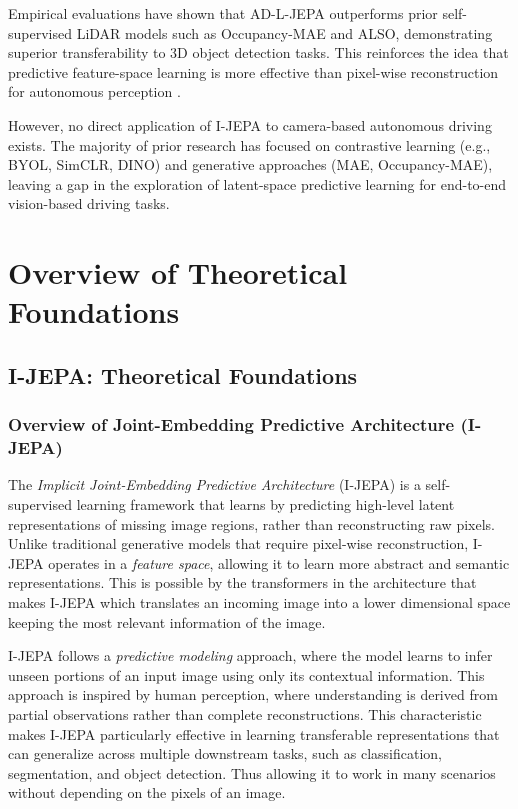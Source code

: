 \documentclass{article}
\begin{document}
Empirical evaluations have shown that AD-L-JEPA outperforms prior self-supervised LiDAR models such as Occupancy-MAE and ALSO, demonstrating superior transferability to 3D object detection tasks. This reinforces the idea that predictive feature-space learning is more effective than pixel-wise reconstruction for autonomous perception \citep{zhu2025ad}.

However, no direct application of I-JEPA to camera-based autonomous driving exists. The majority of prior research has focused on contrastive learning (e.g., BYOL, SimCLR, DINO) and generative approaches (MAE, Occupancy-MAE), leaving a gap in the exploration of latent-space predictive learning for end-to-end vision-based driving tasks.

\section {Overview of Theoretical Foundations}
\subsection{I-JEPA: Theoretical Foundations}

\subsubsection{Overview of Joint-Embedding Predictive Architecture (I-JEPA)}
The \textit{Implicit Joint-Embedding Predictive Architecture} (I-JEPA) \citep{assran2023self} is a self-supervised learning framework that learns by predicting high-level latent representations of missing image regions, rather than reconstructing raw pixels. Unlike traditional generative models that require pixel-wise reconstruction, I-JEPA operates in a \textit{feature space}, allowing it to learn more abstract and semantic representations. This is possible by the transformers in the architecture that makes I-JEPA which translates an incoming image into a lower dimensional space keeping the most relevant information of the image. 

I-JEPA follows a \textit{predictive modeling} approach, where the model learns to infer unseen portions of an input image using only its contextual information. This approach is inspired by human perception, where understanding is derived from partial observations rather than complete reconstructions. This characteristic makes I-JEPA particularly effective in learning transferable representations that can generalize across multiple downstream tasks, such as classification, segmentation, and object detection. Thus allowing it to work in many scenarios without depending on the pixels of an image. 
\end{document}
